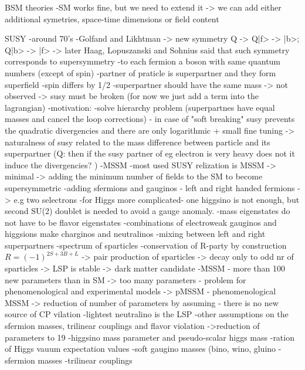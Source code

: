 BSM theories
-SM works fine, but we need to extend it -> we can add either additional symetries, space-time dimensions or field content

SUSY
-around 70's
-Golfand and Likhtman -> new symmetry Q -> Q|f> -> |b>; Q|b> -> |f> -> later Haag, Lopuszanski and Sohnius said that such symmetry corresponds to supersymmetry
-to each fermion a boson  with same quantum numbers (except of spin)
-partner of praticle is superpartner and they form superfield
-spin differs by 1/2
-superpartner should have the same mass -> not observed -> susy must be broken (for now we just add a term into the lagrangian)
-motivation:
	-solve hierarchy problem (superpartnes have equal masses and cancel the loop corrections) - in case of "soft breaking" susy prevents the quadratic divergencies and there are only logarithmic + small fine tuning
	-> naturalness of susy related to the mass difference between particle and its superpartner (Q: then if the susy partner of eg electron is very heavy does not it induce the divergencies? )
-MSSM
-most used SUSY relization is MSSM -> minimal -> adding the minimum number of fields to the SM to become supersymmetric
-adding sfermions and gauginos - left and right handed fermions -> e.g two selectrons
-for Higgs more complicated- one higgsino is not enough, but second SU(2) doublet is needed to avoid a gauge anomaly.
-mass eigenstates do not have to be flavor eigenstates
-combinations of electroweak gauginos and higgsions make charginos and neutralinos
-mixing between left and right superpartners 
-spectrum of sparticles
-conservation of R-party by construction $R=(-1)^{2S+3B+L} $
	-> pair production of sparticles
        -> decay only to odd nr of sparticles
        -> LSP is stable -> dark matter candidate
-MSSM - more than 100 new parameters than in SM
-> too many parameters - problem for phenomenological and experimental models
-> pMSSM - phenomenological MSSM -> reduction of number of parameters by assuming
	- there is no new source of CP vilation
	-lightest neutralino is the LSP
	-other assumptions on the sfermion masses, trilinear couplings and flavor violation
	->reduction of parameters to 19
		-higgsino mass parameter and pseudo-scalar higgs mass 
		-ration of Higgs vauum expectation values
		-soft gaugino masses (bino, wino, gluino
		-sfermion masses
		-trilinear couplings
